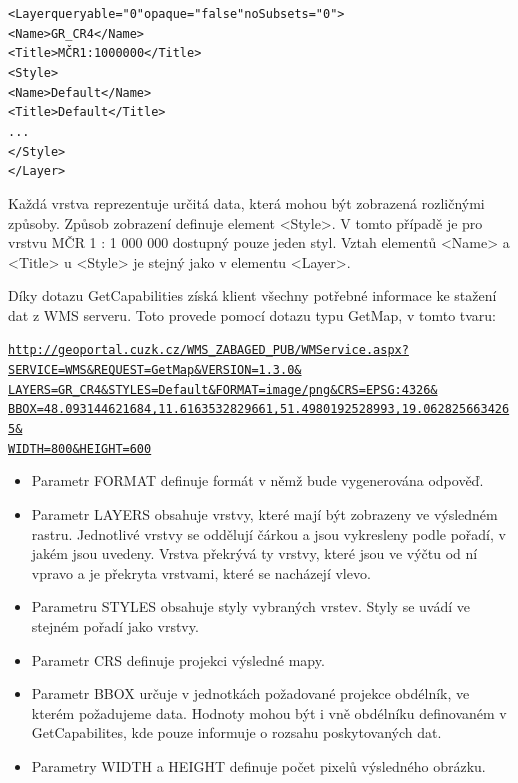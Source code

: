 \documentclass[a4paper,12pt]{article}
\begin{document}
\begin{alltt}\footnotesize
<Layer queryable="0" opaque="false" noSubsets="0">
    <Name>GR_CR4</Name>
    <Title>MČR 1 : 1 000 000</Title>
    <Style>
        <Name>Default</Name>
        <Title>Default</Title>
          ...
    </Style>
</Layer>
\end{alltt}


Každá vrstva reprezentuje určitá data, která mohou být zobrazená rozličnými způsoby. Způsob zobrazení definuje element <Style>. V tomto případě  je pro vrstvu MČR 1 : 1 000 000 
dostupný pouze jeden styl. Vztah elementů <Name> a <Title> u <Style> je stejný jako v elementu <Layer>.

Díky dotazu GetCapabilities získá klient všechny potřebné informace ke stažení dat z WMS serveru. 
Toto provede pomocí dotazu typu GetMap, v tomto tvaru:



\newcommand{\CUZKgetMap}{http://geoportal.cuzk.cz/WMS_ZABAGED_PUB/WMService.aspx?SERVICE=WMS&REQUEST=GetMap&VERSION=1.3.0&LAYERS=GR_CR4&STYLES=Default&FORMAT=image/png&CRS=EPSG:4326&BBOX=48.093144621684,11.6163532829661,51.4980192528993,19.0628256634265&WIDTH=800&HEIGHT=600}
\begin{alltt}\footnotesize
\href{\CUZKgetMap}{http://geoportal.cuzk.cz/WMS\_ZABAGED\_PUB/WMService.aspx?}
\href{\CUZKgetMap}{SERVICE=WMS\&REQUEST=GetMap\&VERSION=1.3.0\&}
\href{\CUZKgetMap}{LAYERS=GR\_CR4\&STYLES=Default\&FORMAT=image/png\&CRS=EPSG:4326\&}
\href{\CUZKgetMap}{BBOX=48.093144621684,11.6163532829661,51.4980192528993,19.0628256634265\&}
\href{\CUZKgetMap}{WIDTH=800\&HEIGHT=600}
\end{alltt}


\begin{itemize}
  \item Parametr FORMAT definuje formát v němž bude vygenerována odpověď. 
  \item Parametr LAYERS obsahuje vrstvy, které mají být zobrazeny ve výsledném rastru. Jednotlivé vrstvy se oddělují čárkou a jsou vykresleny podle pořadí, v jakém jsou uvedeny. Vrstva překrývá ty vrstvy, které jsou ve výčtu od ní vpravo a je překryta vrstvami, které se nacházejí vlevo.   
  \item Parametru STYLES obsahuje styly vybraných vrstev. Styly se uvádí ve stejném pořadí jako vrstvy.    
  \item Parametr CRS definuje projekci výsledné mapy. 
  \item Parametr BBOX určuje v jednotkách požadované projekce obdélník, ve kterém požadujeme data. Hodnoty mohou být i vně obdélníku definovaném v GetCapabilites,
	kde pouze informuje o rozsahu poskytovaných dat.  
  \item Parametry WIDTH a HEIGHT definuje počet pixelů výsledného obrázku. 
\end{itemize}
\end{document}
